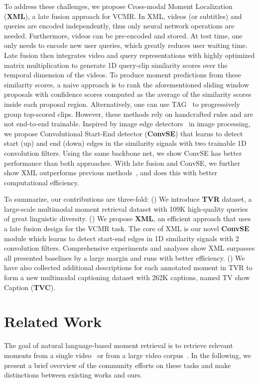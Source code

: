 \documentclass[runningheads]{llncs}
\begin{document}
To address these challenges, we propose Cross-modal Moment Localization (\textbf{XML}), a late fusion approach for VCMR. In XML, videos (or subtitles) and queries are encoded independently, thus only  neural network operations are needed. 
Furthermore, videos can be pre-encoded and stored. At test time, one only needs to encode new user queries, which greatly reduces user waiting time. Late fusion then integrates video and query representations with highly optimized matrix multiplication to generate 1D query-clip similarity scores over the temporal dimension of the videos. To produce moment predictions from these similarity scores, a naive approach is to rank the aforementioned sliding window proposals with confidence scores computed as the average of the similarity scores inside each proposal region. 
Alternatively, one can use TAG~\cite{zhao2017temporal} to progressively group top-scored clips. 
However, these methods rely on handcrafted rules and are not end-to-end trainable.
Inspired by image edge detectors~\cite{szeliski2010computer} in image processing, we propose Convolutional Start-End detector (\textbf{ConvSE}) that learns to detect start (up) and end (down) edges in the similarity signals with two trainable 1D convolution filters. 
Using the same backbone net, we show ConvSE has better performance than both approaches.
With late fusion and ConvSE, we further show XML outperforms previous methods~\cite{anne2017localizing,escorcia2019temporal,ghosh2019excl}, and does this with better computational efficiency. 


To summarize, our contributions are three-fold: 
() We introduce \textbf{TVR} dataset, a large-scale multimodal moment retrieval dataset with 109K high-quality queries of great linguistic diversity.
() We propose \textbf{XML}, an efficient approach that uses a late fusion design for the VCMR task. The core of XML is our novel \textbf{ConvSE} module which learns to detect start-end edges in 1D similarity signals with 2 convolution filters. Comprehensive experiments and analyses show XML surpasses all presented baselines by a large margin and runs with better efficiency. 
() We have also collected additional descriptions for each annotated moment in TVR to form a new multimodal captioning dataset with 262K captions, named TV show Caption (\textbf{TVC}).
 \section{Related Work}\label{related_work}
The goal of natural language-based moment retrieval is to retrieve relevant moments from a single video~\cite{anne2017localizing,gao2017tall} or from a large video corpus~\cite{escorcia2019temporal}. 
In the following, we present a brief overview of the community efforts on these tasks and make distinctions between existing works and ours.
\end{document}
